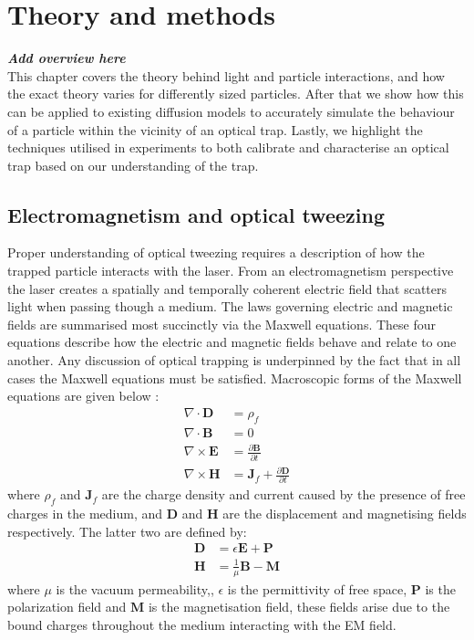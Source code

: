 \chapter{Theory and methods}
\label{chapter:theory}
\textit{\textbf{Add overview here}} \\
This chapter covers the theory behind light and particle interactions, 
and how the exact theory varies for differently sized particles. After 
that we show how this can be applied to existing diffusion models to 
accurately simulate the behaviour of a particle within the vicinity of 
an optical trap. Lastly, we highlight the techniques utilised in 
experiments to both calibrate and characterise an optical trap based 
on our understanding of the trap. 

\section{Electromagnetism and optical tweezing}

Proper understanding of optical tweezing requires a description
of how the trapped particle interacts with the laser. From an
electromagnetism perspective the laser creates a spatially and 
temporally coherent electric field that scatters light when 
passing though a medium. The laws governing electric and magnetic 
fields are summarised most succinctly via the Maxwell equations. 
These four equations describe how the electric and magnetic fields 
behave and relate to one another. Any discussion of optical trapping 
is underpinned by the fact that in all cases the Maxwell equations 
must be satisfied. Macroscopic forms of the Maxwell equations are 
given below
\cite{Jackson_1975}:
\begin{align}
	\nabla \cdot \mathbf{D}
	&= \rho_f
	\\
	\nabla \cdot \mathbf{B}
	&= 0
	\\
	\nabla \times \mathbf{E}
	&= \frac{\partial \mathbf{B}}{\partial t}
	\\
	\nabla \times \mathbf{H}
	&= \mathbf{J}_f +\frac{\partial \mathbf{D}}{\partial t}  
\end{align}
where $\rho_f$ and $\mathbf{J}_f$ are the charge density and 
current caused by the presence of free charges in the medium, 
and $\mathbf{D}$ and $\mathbf{H}$ are the displacement and 
magnetising fields respectively. The latter two are defined by:
\begin{align}
	\mathbf{D} &= \epsilon\mathbf{E}+\mathbf{P} 
	\\ 
	\mathbf{H} &= \frac{1}{\mu}\mathbf{B}-\mathbf{M}
\end{align}
where $\mu$ is the vacuum permeability,, $\epsilon$ is the 
permittivity of free space, $\mathbf{P}$ is the polarization 
field and $\mathbf{M}$ is the magnetisation field, these 
fields arise due to the bound charges throughout the medium 
interacting with the EM field. 

